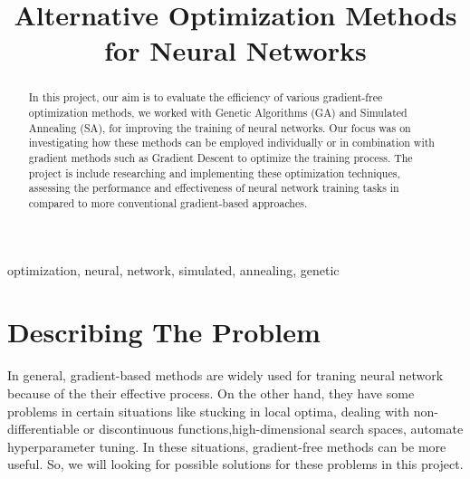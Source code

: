 \documentclass[conference]{IEEEtran}
\begin{document}
\title{Alternative Optimization Methods for Neural Networks}

\author{
\and
{}
\and
{}
}

\maketitle

\begin{abstract}
In this project, our aim is to evaluate the efficiency of various gradient-free optimization methods, we worked with Genetic Algorithms (GA) and Simulated Annealing (SA), for improving the training of neural networks. Our focus was on investigating how these methods can be employed individually or in combination with gradient methods such as Gradient Descent to optimize the training process. The project is include researching and implementing these optimization techniques, assessing the performance and effectiveness of neural network training tasks in compared to more conventional gradient-based approaches.
\end{abstract}

\begin{IEEEkeywords}
optimization, neural, network, simulated, annealing, genetic
\end{IEEEkeywords}

\section{\textbf{Describing The Problem}}

In general, gradient-based methods are widely used for traning neural network because of the their effective process. On the other hand, they have some problems in certain situations like stucking in local optima, dealing with non-differentiable or discontinuous functions,high-dimensional search spaces, automate hyperparameter tuning. In these situations, gradient-free methods can be more useful. So, we will looking for possible solutions for these problems in this project.
\end{document}
